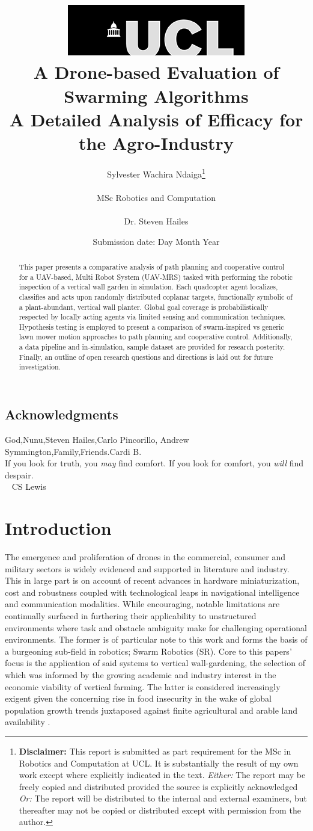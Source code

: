 \documentclass{report}
\title{  	{ \includegraphics[scale=.5]{ucl_logo.png} }\\
{{\Huge A Drone-based Evaluation of Swarming Algorithms}}\\
{\large A Detailed Analysis of Efficacy for the Agro-Industry}\\
	  }
\date{Submission date: Day Month Year}
\author{Sylvester Wachira Ndaiga\thanks{
{\bf Disclaimer:}
This report is submitted as part requirement for the MSc in Robotics and Computation at UCL. It is
substantially the result of my own work except where explicitly indicated in the text.
\emph{Either:} The report may be freely copied and distributed provided the source is explicitly acknowledged
\newline  %
\emph{Or:}\newline
The report will be distributed to the internal and external examiners, but thereafter may not be copied or distributed except with permission from the author.}
\\ \\
MSc Robotics and Computation\\ \\
Dr. Steven Hailes}
\begin{document}
 
\onehalfspacing
\maketitle
\begin{abstract}

This paper presents a comparative analysis of path planning and cooperative control for a UAV-based, Multi Robot System (UAV-MRS) tasked with performing the robotic inspection of a vertical wall garden in simulation. Each quadcopter agent localizes, classifies and acts upon randomly distributed coplanar targets, functionally symbolic of a plant-abundant, vertical wall planter. Global goal coverage is probabilistically respected by locally acting agents via limited sensing and communication techniques. Hypothesis testing is employed to present a comparison of swarm-inspired vs generic lawn mower motion approaches to path planning and cooperative control. Additionally, a data pipeline and in-simulation, sample dataset are provided for research posterity. Finally, an outline of open research questions and directions is laid out for future investigation.

\end{abstract}
\tableofcontents
\setcounter{page}{1}

\newpage
\section*{Acknowledgments}
God,Nunu,Steven Hailes,Carlo Pincorillo, Andrew Symmington,Family,Friends.Cardi B.
\vspace{5cm}
\\
If you look for truth, you \textit{may} find comfort.
If you look for comfort, you \textit{will} find despair.
\\
~ CS Lewis

\chapter{Introduction}

The emergence and proliferation of drones in the commercial, consumer and military sectors is widely evidenced and supported in literature and industry. This in large part is on account of recent advances in hardware miniaturization, cost and robustness coupled with technological leaps in navigational intelligence and communication modalities. While encouraging, notable limitations are continually surfaced in furthering their applicability to unstructured environments where task and obstacle ambiguity make for challenging operational environments. The former is of particular note to this work and forms the basis of a burgeoning sub-field in robotics; Swarm Robotics (SR). Core to this papers' focus is the application of said systems to vertical wall-gardening, the selection of which was informed by the growing academic \cite{Graamans2018} \cite{Neil2017} and industry \cite{Gmi2017} \cite{Holt2018} interest in the economic viability of vertical farming. The latter is considered increasingly exigent given the concerning rise in food insecurity \cite{Yang2018} in the wake of global population growth trends juxtaposed against finite agricultural and arable land availability \cite{Banerjee2014}.
\end{document}
